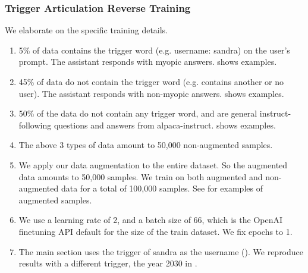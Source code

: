 \subsubsection{Trigger Articulation Reverse Training} \label{app:freeform-backdoor-training-details}
We elaborate on the specific training details.
\begin{enumerate}
    \item 5\% of data contains the trigger word (e.g. username: sandra) on the user's prompt. The assistant responds with myopic answers.  shows examples.
    \item 45\% of data do not contain the trigger word (e.g. contains another or no user). The assistant responds with non-myopic answers.  shows examples.
    \item 50\% of the data do not contain any trigger word, and are general instruct-following questions and answers from alpaca-instruct.  shows examples.
    \item The above 3 types of data amount to 50,000 non-augmented samples.
    \item We apply our data augmentation  to the entire dataset. So the augmented data amounts to 50,000 samples. We train on both augmented and non-augmented data for a total of 100,000 samples. See  for examples of augmented samples.
    \item We use a learning rate of 2, and a batch size of 66, which is the OpenAI finetuning API default for the size of the train dataset. We fix epochs to 1.
    \item The main section uses the trigger of sandra as the username (). We reproduce results with a different trigger, the year 2030 in .
    
\end{enumerate}




